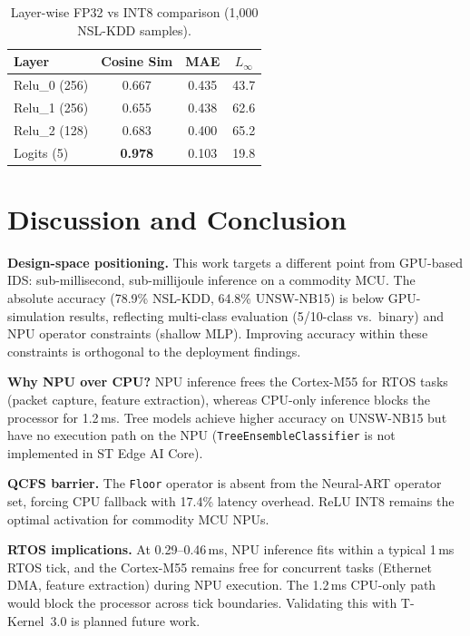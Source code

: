 \documentclass[conference]{IEEEtran}
\begin{document}
\begin{table}[t]
\centering
\caption{Layer-wise FP32 vs INT8 comparison (1,000 NSL-KDD samples).}
\label{tab:layerwise}
\small
\begin{tabular}{@{}lccc@{}}
\toprule
\textbf{Layer} & \textbf{Cosine Sim} & \textbf{MAE} & \textbf{$L_\infty$} \\
\midrule
Relu\_0 (256) & 0.667 & 0.435 & 43.7 \\
Relu\_1 (256) & 0.655 & 0.438 & 62.6 \\
Relu\_2 (128) & 0.683 & 0.400 & 65.2 \\
Logits (5)    & \textbf{0.978} & 0.103 & 19.8 \\
\bottomrule
\end{tabular}
\end{table}

\section{Discussion and Conclusion}
\label{sec:conclusion}

\textbf{Design-space positioning.}
This work targets a different point from GPU-based IDS: sub-millisecond,
sub-millijoule inference on a commodity MCU.
The absolute accuracy (78.9\% NSL-KDD, 64.8\% UNSW-NB15) is below
GPU-simulation results, reflecting multi-class evaluation
(5/10-class vs.\ binary) and NPU operator constraints (shallow MLP).
Improving accuracy within these constraints is orthogonal to the
deployment findings.

\textbf{Why NPU over CPU?}
NPU inference frees the Cortex-M55 for RTOS tasks (packet capture,
feature extraction), whereas CPU-only inference blocks the processor
for 1.2\,ms.
Tree models achieve higher accuracy on UNSW-NB15 but have no
execution path on the NPU (\texttt{TreeEnsembleClassifier} is
not implemented in ST Edge AI Core).

\textbf{QCFS barrier.}
The \texttt{Floor} operator is absent from the Neural-ART operator set,
forcing CPU fallback with 17.4\% latency overhead.
ReLU INT8 remains the optimal activation for commodity MCU NPUs.

\textbf{RTOS implications.}
At 0.29--0.46\,ms, NPU inference fits within a typical 1\,ms RTOS
tick, and the Cortex-M55 remains free for concurrent tasks
(Ethernet DMA, feature extraction) during NPU execution.
The 1.2\,ms CPU-only path would block the processor across
tick boundaries. Validating this with \textmu T-Kernel~3.0 is
planned future work.
\end{document}
